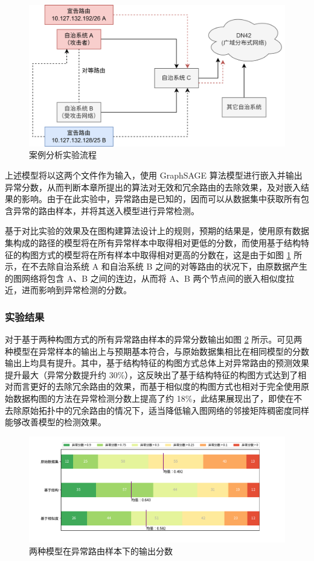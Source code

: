 \begin{figure}[h]
    \includegraphics[width=0.7\linewidth]{chapter/c3_images/c3_case_flow.png}
    \caption{案例分析实验流程}
    \label{c3_case-flow}
\end{figure}

上述模型将以这两个文件作为输入，使用 GraphSAGE 算法模型进行嵌入并输出异常分数，从而判断本章所提出的算法对无效和冗余路由的去除效果，及对嵌入结果的影响。由于在此实验中，异常路由是已知的，因而可以从数据集中获取所有包含异常的路由样本，并将其送入模型进行异常检测。

基于对比实验的效果及在图构建算法设计上的规则，预期的结果是，使用原有数据集构成的路径的模型将在所有异常样本中取得相对更低的分数，而使用基于结构特征的构图方式的模型将在所有样本中取得相对更高的分数在，这是由于如图 \ref{c3_case-flow} 所示，在不去除自治系统 A 和自治系统 B 之间的对等路由的状况下，由原数据产生的图网络将包含 A、B 之间的连边，从而将 A、B 两个节点间的嵌入相似度拉近，进而影响到异常检测的分数。

\subsubsection{实验结果}

对于基于两种构图方式的所有异常路由样本的异常分数输出如图 \ref{c3_case-score} 所示。可见两种模型在异常样本的输出上与预期基本符合，与原始数据集相比在相同模型的分数输出上均具有提升。其中，基于结构特征的构图方式总体上对异常路由的预测效果提升最大（异常分数提升约 30\%），这反映出了基于结构特征的构图方式达到了相对而言更好的去除冗余路由的效果，而基于相似度的构图方式也相对于完全使用原始数据构图的方法在异常检测分数上提高了约 18\%，此结果展现出了，即使在不去除原始拓扑中的冗余路由的情况下，适当降低输入图网络的邻接矩阵稠密度同样能够改善模型的检测效果。

\begin{figure}[h]
    \includegraphics[width=\linewidth]{chapter/c3_images/c3_case-score.pdf}
    \caption{两种模型在异常路由样本下的输出分数}
    \label{c3_case-score}
\end{figure}